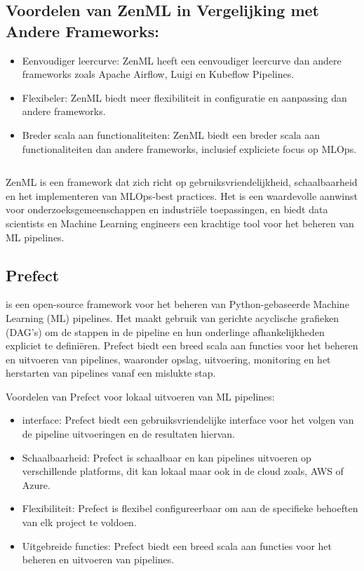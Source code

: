 \subsection{Voordelen van ZenML in Vergelijking met Andere Frameworks:}
\begin{itemize}
    \item Eenvoudiger leercurve: ZenML heeft een eenvoudiger leercurve dan andere frameworks zoals Apache Airflow, Luigi en Kubeflow Pipelines.
    \item Flexibeler: ZenML biedt meer flexibiliteit in configuratie en aanpassing dan andere frameworks.
    \item Breder scala aan functionaliteiten: ZenML biedt een breder scala aan functionaliteiten dan andere frameworks, inclusief expliciete focus op MLOps.
\end{itemize}
\begin{verbatim}
\end{verbatim}
ZenML is een framework dat zich richt op gebruiksvriendelijkheid, schaalbaarheid en het implementeren van MLOps-best practices. Het is een waardevolle aanwinst voor onderzoeksgemeenschappen en industriële toepassingen, en biedt data scientists en Machine Learning engineers een krachtige tool voor het beheren van ML pipelines.

\subsection{Prefect}

\textcite{Prefect2024} is een open-source framework voor het beheren van Python-gebaseerde Machine Learning (ML) pipelines. Het maakt gebruik van gerichte acyclische grafieken (DAG's) om de stappen in de pipeline en hun onderlinge afhankelijkheden expliciet te definiëren. Prefect biedt een breed scala aan functies voor het beheren en uitvoeren van pipelines, waaronder opslag, uitvoering, monitoring en het herstarten van pipelines vanaf een mislukte stap.

Voordelen van Prefect voor lokaal uitvoeren van ML pipelines:

\begin{itemize}
  \item interface: Prefect biedt een gebruiksvriendelijke interface voor het volgen van de pipeline uitvoeringen en de resultaten hiervan.
  \item Schaalbaarheid: Prefect is schaalbaar en kan pipelines uitvoeren op verschillende platforms, dit kan lokaal maar ook in de cloud zoals, AWS of Azure.
  \item Flexibiliteit: Prefect is flexibel configureerbaar om aan de specifieke behoeften van elk project te voldoen.
  \item Uitgebreide functies: Prefect biedt een breed scala aan functies voor het beheren en uitvoeren van pipelines.
\end{itemize}

